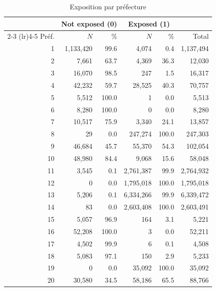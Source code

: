 
\begin{table}[htbp]
\centering
\caption{Exposition par préfecture}
\begin{tabular}{r rr rr r}
\toprule
 & \multicolumn{2}{c}{Not exposed (0)} & \multicolumn{2}{c}{Exposed (1)} & \\
\cmidrule(lr){2-3} \cmidrule(lr){4-5}
Préf. & $N$ & \% & $N$ & \% & Total \\
\midrule
 1  & 1{,}133{,}420 & 99.6 &     4{,}074 &  0.4 &  1{,}137{,}494 \\
 2  &     7{,}661   & 63.7 &     4{,}369 & 36.3 &     12{,}030   \\
 3  &    16{,}070   & 98.5 &       247   &  1.5 &     16{,}317   \\
 4  &    42{,}232   & 59.7 &    28{,}525 & 40.3 &     70{,}757   \\
 5  &     5{,}512   &100.0 &         1   &  0.0 &      5{,}513   \\
 6  &     8{,}280   &100.0 &         0   &  0.0 &      8{,}280   \\
 7  &    10{,}517   & 75.9 &     3{,}340 & 24.1 &     13{,}857   \\
 8  &        29     &  0.0 &   247{,}274 &100.0 &    247{,}303   \\
 9  &    46{,}684   & 45.7 &    55{,}370 & 54.3 &    102{,}054   \\
10  &    48{,}980   & 84.4 &     9{,}068 & 15.6 &     58{,}048   \\
11  &     3{,}545   &  0.1 & 2{,}761{,}387 & 99.9 & 2{,}764{,}932 \\
12  &         0     &  0.0 & 1{,}795{,}018 &100.0 & 1{,}795{,}018 \\
13  &     5{,}206   &  0.1 & 6{,}334{,}266 & 99.9 & 6{,}339{,}472 \\
14  &        83     &  0.0 & 2{,}603{,}408 &100.0 & 2{,}603{,}491 \\
15  &     5{,}057   & 96.9 &       164   &  3.1 &      5{,}221   \\
16  &    52{,}208   &100.0 &         3   &  0.0 &     52{,}211   \\
17  &     4{,}502   & 99.9 &         6   &  0.1 &      4{,}508   \\
18  &     5{,}083   & 97.1 &       150   &  2.9 &      5{,}233   \\
19  &         0     &  0.0 &    35{,}092 &100.0 &     35{,}092   \\
20  &    30{,}580   & 34.5 &    58{,}186 & 65.5 &     88{,}766   \\

\end{tabular}
\end{table}
